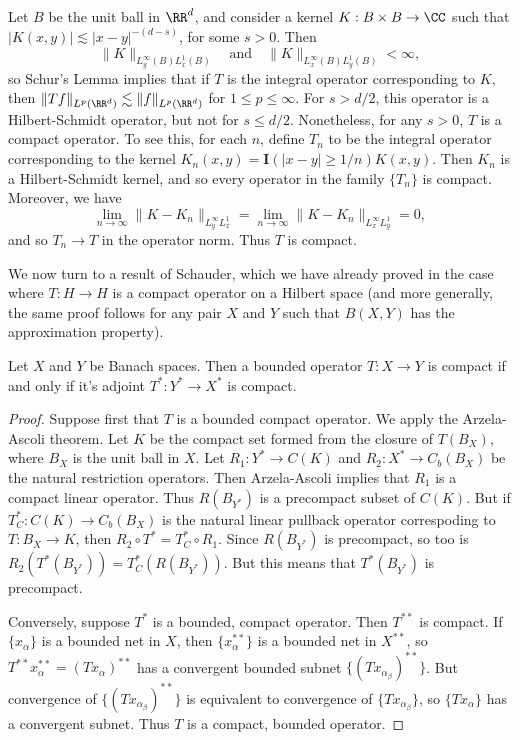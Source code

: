 \begin{example}
    Let $B$ be the unit ball in $\RR^d$, and consider a kernel $K: B \times B \to \CC$ such that $|K(x,y)| \lesssim |x - y|^{-(d-s)}$, for some $s > 0$. Then
    \[ \| K \|_{L^\infty_y(B) L^1_x(B)}\quad\text{and}\quad \| K \|_{L^\infty_x(B) L^1_y(B)} < \infty, \]
    so Schur's Lemma implies that if $T$ is the integral operator corresponding to $K$, then $\| T f \|_{L^p(\RR^d)} \lesssim \| f \|_{L^p(\RR^d)}$ for $1 \leq p \leq \infty$. For $s > d/2$, this operator is a Hilbert-Schmidt operator, but not for $s \leq d/2$. Nonetheless, for any $s > 0$, $T$ is a compact operator. To see this, for each $n$, define $T_n$ to be the integral operator corresponding to the kernel $K_n(x,y) = \mathbf{I}(|x - y| \geq 1/n) K(x,y)$. Then $K_n$ is a Hilbert-Schmidt kernel, and so every operator in the family $\{ T_n \}$ is compact. Moreover, we have
    \[ \lim_{n \to \infty} \| K - K_n \|_{L^\infty_y L^1_x} = \lim_{n \to \infty} \| K - K_n \|_{L^\infty_x L^1_y} = 0, \]
    and so $T_n \to T$ in the operator norm. Thus $T$ is compact.
\end{example}

We now turn to a result of Schauder, which we have already proved in the case where $T: H \to H$ is a compact operator on a Hilbert space (and more generally, the same proof follows for any pair $X$ and $Y$ such that $B(X,Y)$ has the approximation property).

\begin{theorem}
    Let $X$ and $Y$ be Banach spaces. Then a bounded operator $T: X \to Y$ is compact if and only if it's adjoint $T^*: Y^* \to X^*$ is compact.
\end{theorem}
\begin{proof}
    Suppose first that $T$ is a bounded compact operator. We apply the Arzela-Ascoli theorem. Let $K$ be the compact set formed from the closure of $T(B_X)$, where $B_X$ is the unit ball in $X$. Let $R_1: Y^* \to C(K)$ and $R_2: X^* \to C_b(B_X)$ be the natural restriction operators. Then Arzela-Ascoli implies that $R_1$ is a compact linear operator. Thus $R(B_{Y^*})$ is a precompact subset of $C(K)$. But if $T^*_C: C(K) \to C_b(B_X)$ is the natural linear pullback operator correspoding to $T: B_X \to K$, then $R_2 \circ T^* = T^*_C \circ R_1$. Since $R(B_{Y^*})$ is precompact, so too is $R_2(T^*(B_{Y^*})) = T^*_C(R(B_{Y^*}))$. But this means that $T^*(B_{Y^*})$ is precompact.

    Conversely, suppose $T^*$ is a bounded, compact operator. Then $T^{**}$ is compact. If $\{ x_\alpha \}$ is a bounded net in $X$, then $\{ x_\alpha^{**} \}$ is a bounded net in $X^{**}$, so $T^{**} x_\alpha^{**} = (Tx_\alpha)^{**}$ has a convergent bounded subnet $\{ (Tx_{\alpha_\beta})^{**} \}$. But convergence of $\{ (Tx_{\alpha_\beta})^{**} \}$ is equivalent to convergence of $\{ Tx_{\alpha_\beta} \}$, so $\{ Tx_\alpha \}$ has a convergent subnet. Thus $T$ is a compact, bounded operator. 
\end{proof}

